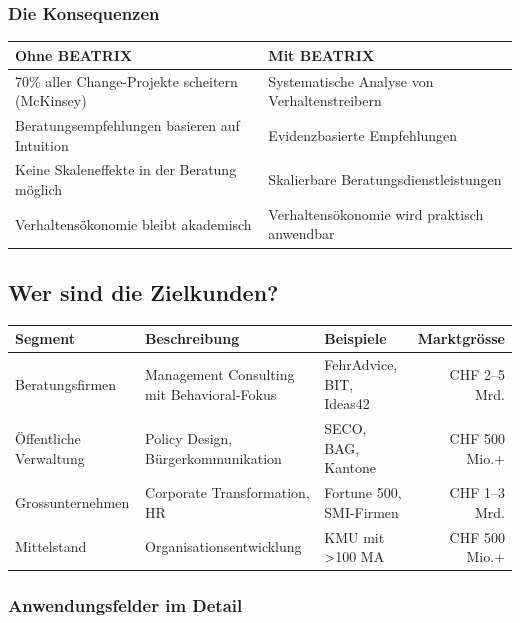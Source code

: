 \documentclass[11pt,a4paper]{article}
\begin{document}
\subsubsection{Die Konsequenzen}

\begin{table}[h]
\centering
\begin{tabular}{ll}
\toprule
\textbf{Ohne BEATRIX} & \textbf{Mit BEATRIX} \\
\midrule
70\% aller Change-Projekte scheitern (McKinsey) & Systematische Analyse von Verhaltenstreibern \\
Beratungsempfehlungen basieren auf Intuition & Evidenzbasierte Empfehlungen \\
Keine Skaleneffekte in der Beratung möglich & Skalierbare Beratungsdienstleistungen \\
Verhaltensökonomie bleibt akademisch & Verhaltensökonomie wird praktisch anwendbar \\
\bottomrule
\end{tabular}
\end{table}

\subsection{Wer sind die Zielkunden?}

\begin{table}[h]
\centering
\small
\begin{tabularx}{\textwidth}{lXXr}
\toprule
\textbf{Segment} & \textbf{Beschreibung} & \textbf{Beispiele} & \textbf{Marktgrösse} \\
\midrule
Beratungsfirmen & Management Consulting mit Behavioral-Fokus & FehrAdvice, BIT, Ideas42 & CHF 2--5 Mrd. \\
Öffentliche Verwaltung & Policy Design, Bürgerkommunikation & SECO, BAG, Kantone & CHF 500 Mio.+ \\
Grossunternehmen & Corporate Transformation, HR & Fortune 500, SMI-Firmen & CHF 1--3 Mrd. \\
Mittelstand & Organisationsentwicklung & KMU mit >100 MA & CHF 500 Mio.+ \\
\bottomrule
\end{tabularx}
\end{table}

\subsubsection{Anwendungsfelder im Detail}
\end{document}
